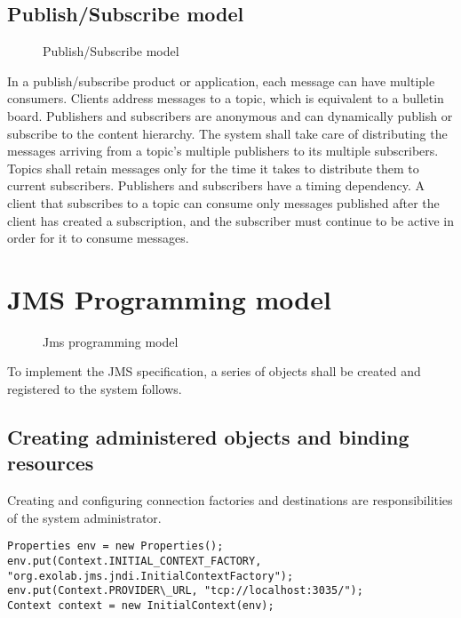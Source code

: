 \documentclass[9pt,twocolumn,twoside]{styles/osajnl}
\begin{document}
\subsection{Publish/Subscribe model}

\begin{figure}[htbp]
\centering
{}
\caption{\cite{www-jms-tutorialoracle} Publish/Subscribe model}
\label{fig: Publish/Subscribe messaging}
\end{figure}

In a publish/subscribe product or application, each message can have
multiple consumers. Clients address messages to a topic, which is
equivalent to a bulletin board. Publishers and subscribers are
anonymous and can dynamically publish or subscribe to the content
hierarchy. The system shall take care of distributing the messages
arriving from a topic’s multiple publishers to its multiple
subscribers. Topics shall retain messages only for the time it takes
to distribute them to current subscribers.  Publishers and subscribers
have a timing dependency. A client that subscribes to a topic can
consume only messages published after the client has created a
subscription, and the subscriber must continue to be active in order
for it to consume messages. \cite{www-jms-tutorialoracle}


\section{JMS Programming model}

\begin{figure}[htbp]
\centering
{}
\caption{\cite{www-jms-fischli-article} Jms programming model}
\label{fig:JMS Programming Objects}
\end{figure}

To implement the JMS specification, a series of objects shall be
created and registered to the system follows.

\subsection{Creating administered objects and binding resources}

Creating and configuring connection factories and destinations are
responsibilities of the system administrator.

\begin{lstlisting}
Properties env = new Properties();
env.put(Context.INITIAL_CONTEXT_FACTORY,
"org.exolab.jms.jndi.InitialContextFactory");
env.put(Context.PROVIDER\_URL, "tcp://localhost:3035/");
Context context = new InitialContext(env);
\end{lstlisting}
\end{document}
